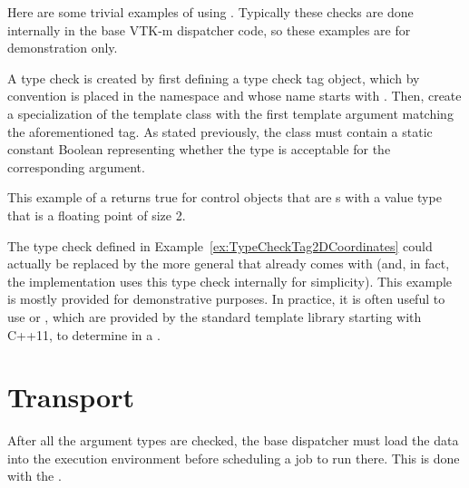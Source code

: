 Here are some trivial examples of using
. Typically these checks are done internally in
the base VTK-m dispatcher code, so these examples are for demonstration
only.


A type check is created by first defining a type check tag object, which by convention is placed in the \vtkmcontarg{} namespace and whose name starts with .
Then, create a specialization of the  template class with the first template argument matching the aforementioned tag.
As stated previously, the  class must contain a  static constant Boolean representing whether the type is acceptable for the corresponding  argument.

This example of a  returns true for control objects that are s with a value type that is a floating point  of size 2.


\begin{didyouknow}
  The type check defined in Example~\ref{ex:TypeCheckTag2DCoordinates} could actually be replaced by the more general  that already comes with \VTKm (and, in fact, the implementation uses this type check internally for simplicity).
  This example is mostly provided for demonstrative purposes.
  In practice, it is often useful to use  or , which are provided by the standard template library starting with C++11, to determine  in a .
\end{didyouknow}



\section{Transport}
\label{sec:Transport}


After all the argument types are checked, the base dispatcher must load the
data into the execution environment before scheduling a job to run
there. This is done with the  .

